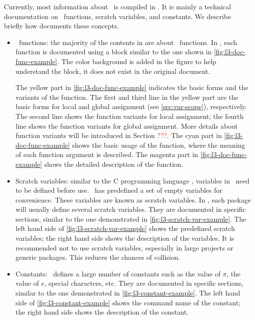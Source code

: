 \documentclass{ltugboat}
\begin{document}
Currently, most information about \liii\ is compiled in \cite{l3interface}. 
It is mainly a technical documentation on \liii\ functions, scratch variables, and constants. 
We describe briefly how \cite{l3interface} documents these concepts.
\begin{itemize}
\item \liii\ functions: the majority of the contents in \cite{l3interface} are about \liii\ functions.
In \cite{l3interface}, each function is documented using a block similar to the one shown in  \cref{fig:l3-doc-func-example}.
The color background is added in the figure to help understand the block, it does not exist in the original document.

The yellow part in \cref{fig:l3-doc-func-example} indicates the basic forms and the variants of the function. 
The first and third line in the yellow part are the basic forms for local and global assignment (see \cref{sec:var-scope}), respectively.
The second line shows the function variants for local assignment; the fourth line shows the function variants for global assignment.
More details about function variants will be introduced in Section \textcolor{red}{???}.
The cyan part in \cref{fig:l3-doc-func-example} shows the basic usage of the function, where the meaning of each function argument is described.
The magenta part in \cref{fig:l3-doc-func-example} shows the detailed description of the function.

\item Scratch variables: similar to the C programming language \cite{ritchie1988c}, variables in \liii\ need to be defined before use. 
\liii\ has predefined a set of empty variables for convenience.
These variables are known as scratch variables.
In \liii, each package will usually define several scratch variables.
They are documented in specific sections, similar to the one demonstrated in \cref{fig:l3-scratch-var-example}.
The left hand side of \cref{fig:l3-scratch-var-example} shows the predefined scratch variables; the right hand side shows the description of the variables.
It is recommended not to use scratch variables, especially in large projects or generic packages.
This reduces the chances of collision.

\item Constants: \liii\ defines a large number of constants such as the value of $\pi$, the value of $e$, special characters, etc. 
They are documented in specific sections, similar to the one demonstrated in \cref{fig:l3-constant-example}.
The left hand side of \cref{fig:l3-constant-example} shows the command name of the constant; the right hand side shows the description of the constant.

\end{itemize}
\end{document}
